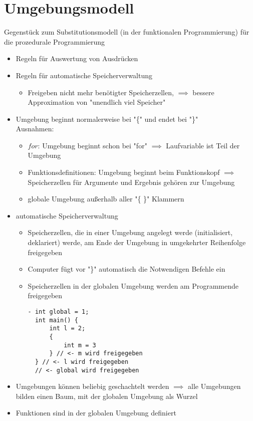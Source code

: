 \documentclass[a4paper]{scrartcl}
\theoremstyle{definition}
\theoremstyle{plain}
\theoremstyle{remark}
\theoremstyle{remark}
\begin{document}
\section{Umgebungsmodell}
\label{sec-9}
Gegenstück zum Substitutionsmodell (in der funktionalen Programmierung) für die prozedurale Programmierung
\begin{itemize}
\item Regeln für Auswertung von Ausdrücken
\item Regeln für automatische Speicherverwaltung
\begin{itemize}
\item Freigeben nicht mehr benötigter Speicherzellen, $\implies$ bessere Approximation von "unendlich viel Speicher"
\end{itemize}
\item Umgebung beginnt normalerweise bei "\{" und endet bei "\}" \\
    Ausnahmen:
\begin{itemize}
\item $for$: Umgebung beginnt schon bei "for" $\implies$ Laufvariable ist Teil der Umgebung
\item Funktionsdefinitionen: Umgebung beginnt beim Funktionskopf $\implies$ Speicherzellen für Argumente und Ergebnis gehören zur Umgebung
\item globale Umgebung außerhalb aller "\{ \}" Klammern
\end{itemize}
\item automatische Speicherverwaltung
\begin{itemize}
\item Speicherzellen, die in einer Umgebung angelegt werde (initialisiert, deklariert) werde, am Ende der Umgebung in umgekehrter Reihenfolge freigegeben
\item Computer fügt vor "\}" automatisch die Notwendigen Befehle ein
\item Speicherzellen in der globalen Umgebung werden am Programmende freigegeben
\begin{verbatim}
- int global = 1;
  int main() {
	  int l = 2;
	  {
		  int m = 3
	  } // <- m wird freigegeben
  } // <- l wird freigegeben
  // <- global wird freigegeben
\end{verbatim}
\end{itemize}
\item Umgebungen können beliebig geschachtelt werden $\implies$ alle Umgebungen bilden einen Baum, mit der globalen Umgebung als Wurzel
\item Funktionen sind in der globalen Umgebung definiert

\end{itemize}
\end{document}
